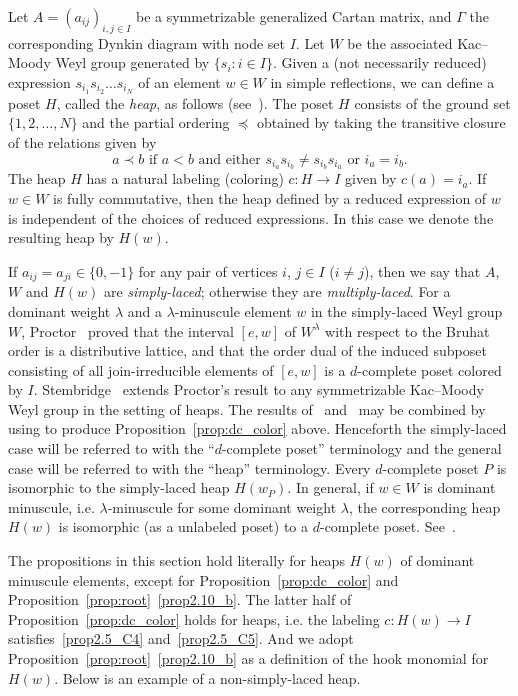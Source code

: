 \documentclass[ALCO,ThmDefs,Unicode,epreuves]{cedram}
\begin{document}
\begin{rema}
\label{rem:heap1}
Let $A = (a_{ij})_{i,j \in I}$ be a symmetrizable generalized Cartan matrix, 
and $\Gamma$ the corresponding Dynkin diagram with node set $I$.
Let $W$ be the associated Kac--Moody Weyl group generated by $\{ s_i : i \in I \}$.
Given a (not necessarily reduced) expression $s_{i_1} s_{i_2} \dots s_{i_N}$ of an element $w \in W$ 
in simple reflections, we can define a poset $H$, called the \emph{heap}, as follows 
(see~\cite{Stem1}).
The poset $H$ consists of the ground set $\{ 1, 2, \dots, N \}$ and the partial ordering 
$\preceq$ obtained by taking the transitive closure of the relations given by
$$
\text{$a \prec b$ if $a < b$ and either $s_{i_a} s_{i_b} \neq s_{i_b} s_{i_a}$ or $i_a = i_b$.}
$$
The heap $H$ has a natural labeling (coloring) $c: H \to I$ given by $c(a) = i_a$.
If $w \in W$ is fully commutative, then the heap defined by a reduced expression of $w$ 
is independent of the choices of reduced expressions.
In this case we denote the resulting heap by $H(w)$.

If $a_{ij} = a_{ji} \in \{ 0, -1 \}$ for any pair of vertices $i$, $j \in I$ ($i \neq j$), 
then we say that $A$, $W$ and $H(w)$ are \emph{simply-laced}; 
otherwise they are \emph{multiply-laced}.
For a dominant weight $\lambda$ and a $\lambda$-minuscule element $w$ in the simply-laced Weyl group $W$,
Proctor~\cite{Proc2} proved that the interval $[e,w]$ of $W^\lambda$ with respect to 
the Bruhat order is a distributive lattice, 
and that the order dual of the induced subposet consisting of all join-irreducible elements of $[e,w]$ 
is a $d$-complete poset colored by $I$.
Stembridge~\cite{Stem2} extends Proctor's result to any symmetrizable Kac--Moody Weyl group 
in the setting of heaps.
The results of~\cite{Proc2} and~\cite{Stem2} may be combined by using 
\cite[Theorem~3.2~(c)]{Stem1} to produce Proposition~\ref{prop:dc_color} above.
Henceforth the simply-laced case will be referred to with the ``$d$-complete poset'' terminology 
and the general case will be referred to with the ``heap'' terminology.
Every $d$-complete poset $P$ is isomorphic to the simply-laced heap $H(w_P)$. 
In general, if $w \in W$ is dominant minuscule, i.e. $\lambda$-minuscule for some dominant weight $\lambda$, 
the corresponding heap $H(w)$ is isomorphic (as a unlabeled poset) to a $d$-complete poset.
See~\cite[Sections~3 and~4]{Stem2}.

The propositions in this section hold literally for heaps $H(w)$ of dominant minuscule elements, 
except for Proposition~\ref{prop:dc_color} and Proposition~\ref{prop:root}~\ref{prop2.10_b}.
The latter half of Proposition~\ref{prop:dc_color} holds for heaps, 
i.e. the labeling $c : H(w) \to I$ satisfies~\ref{prop2.5_C4} and~\ref{prop2.5_C5}.
And we adopt Proposition~\ref{prop:root}~\ref{prop2.10_b} as a definition of the hook monomial for $H(w)$.
Below is an example of a non-simply-laced heap.
\end{rema}
\end{document}

